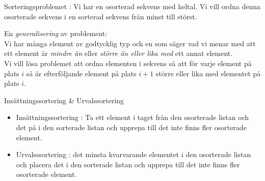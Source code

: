 



\begin{Slide}{Sorteringsproblemet}
: Vi har en osorterad sekvens med heltal. Vi vill ordna denna osorterade sekvens i en sorterad sekvens från minst till störst.
\pause

\vspace{2em}
En \emph{generalisering} av problement: \\ \vspace{1em} Vi har många element av godtycklig typ och en  som säger vad vi menar med att ett element är \emph{mindre än} eller \emph{större än eller lika med} ett annat element. \\ \vspace{1em}
Vi vill lösa problemet att ordna elementen i sekvens så att för varje element på plats $i$ så är efterföljande element på plats $i + 1$ större eller lika med elementet på plats $i$.

\end{Slide}

\begin{Slide}{Insättningssortering \& Urvalssortering}
\begin{itemize}
\item Insättningssortering : Ta ett element i taget från den osorterade listan och  det på  i den sorterade listan och upprepa till det inte finns fler osorterade element.
\pause
\item Urvalsssortering :  det minsta kvarvarande elementet i den osorterade listan och placera det  i den sorterade listan och upprepa till det inte finns fler osorterade element.
\end{itemize}
\end{Slide}



